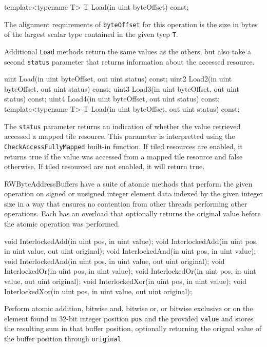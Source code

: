 \begin{HLSL}
  template<typename T>
  T Load(in uint byteOffset) const;
\end{HLSL}

The alignment requirements of \texttt{byteOffset} for this operation is the size in bytes of the largest
scalar type contained in the given tyep \texttt{T}.

Additional \texttt{Load} methods return the same values as the others,
but also take a second \texttt{status} parameter that returns information about the accessed resource.
\begin{HLSL}
  uint Load(in uint byteOffset, out uint status) const;
  uint2 Load2(in uint byteOffset, out uint status) const;
  uint3 Load3(in uint byteOffset, out uint status) const;
  uint4 Load4(in uint byteOffset, out uint status) const;
  template<typename T>
  T Load(in uint byteOffset, out uint status) const;
\end{HLSL}

The \texttt{status} parameter returns an indication of whether the value retrieved accessed a mapped tile
resource. This parameter is interpretted using the \texttt{CheckAccessFullyMapped}
built-in function. If tiled resources are enabled, it returns true if the value was accessed from a mapped
tile resource and false otherwise. If tiled resourced are not enabled, it will return true.


RWByteAddressBuffers have a suite of atomic methods that perform the given operation
on signed or unsigned integer element data indexed by the given integer size
in a way that ensures no contention from other threads performing other operations.
Each has an overload that optionally returns the original value before the atomic operation was performed.

\begin{HLSL}
   void InterlockedAdd(in uint pos, in uint value);
   void InterlockedAdd(in uint pos, in uint value, out uint original);
   void InterlockedAnd(in uint pos, in uint value);
   void InterlockedAnd(in uint pos, in uint value, out uint original);
   void InterlockedOr(in uint pos, in uint value);
   void InterlockedOr(in uint pos, in uint value, out uint original);
   void InterlockedXor(in uint pos, in uint value);
   void InterlockedXor(in uint pos, in uint value, out uint original);
\end{HLSL}

Perform atomic addition, bitwise and, bitwise or, or bitwise exclusive or
on the element found in 32-bit integer position \texttt{pos} and the provided \texttt{value}
and stores the resulting sum in that buffer position,
optionally returning the orignal value of the buffer position through \texttt{original}

